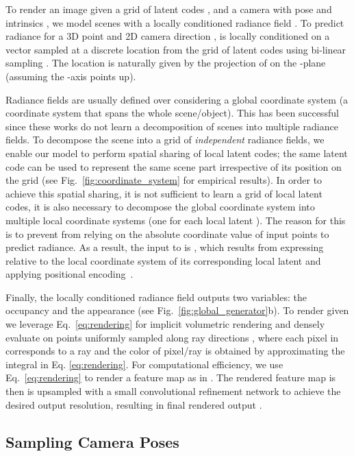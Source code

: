 \documentclass[10pt,twocolumn,letterpaper]{article}
\begin{document}
To render an image  given a grid of latent codes , and a camera with pose  and intrinsics ,  we model scenes with a locally conditioned radiance field \cite{nerf} . To predict radiance for a 3D point  and 2D camera direction ,  is locally conditioned on a vector  sampled at a discrete location  from the grid of latent codes  using bi-linear sampling \cite{stn}. The location  is naturally given by the projection of  on the -plane (assuming the -axis points up). 


Radiance fields are usually defined over  considering a global coordinate system \cite{nerf,graf,pigan} (\ie a coordinate system that spans the whole scene/object). This has been successful since these works do not learn a decomposition of scenes into multiple radiance fields. To decompose the scene into a grid of \textit{independent} radiance fields, we enable our model to perform spatial sharing of local latent codes; the same latent code  can be used to represent the same scene part irrespective of its position  on the grid (see Fig.~\ref{fig:coordinate_system} for empirical results). In order to achieve this spatial sharing, it is not sufficient to learn a grid of local latent codes, it is also necessary to decompose the global coordinate system into multiple local coordinate systems (one for each local latent ). The reason for this is to prevent  from relying on the absolute coordinate value of input points to predict radiance. As a result, the input to  is  , which results from expressing  relative to the local coordinate system of its corresponding local latent  and applying positional encoding~\cite{nerf}.

Finally, the locally conditioned radiance field  outputs two variables: the occupancy  and the appearance  (see Fig.~\ref{fig:global_generator}b). To render  given  we leverage Eq.~\ref{eq:rendering} for implicit volumetric rendering \cite{nerf} and densely evaluate  on points uniformly sampled along ray directions , where each pixel in  corresponds to a ray and the color  of pixel/ray  is obtained by approximating the integral in Eq. \ref{eq:rendering}. For computational efficiency, we use Eq.~\ref{eq:rendering}  to render a feature map as in \cite{giraffe}. The rendered feature map is then is upsampled with a small convolutional refinement network to achieve the desired output resolution, resulting in final rendered output .



\subsection{Sampling Camera Poses}\label{sec:camera_sampling}
\end{document}
